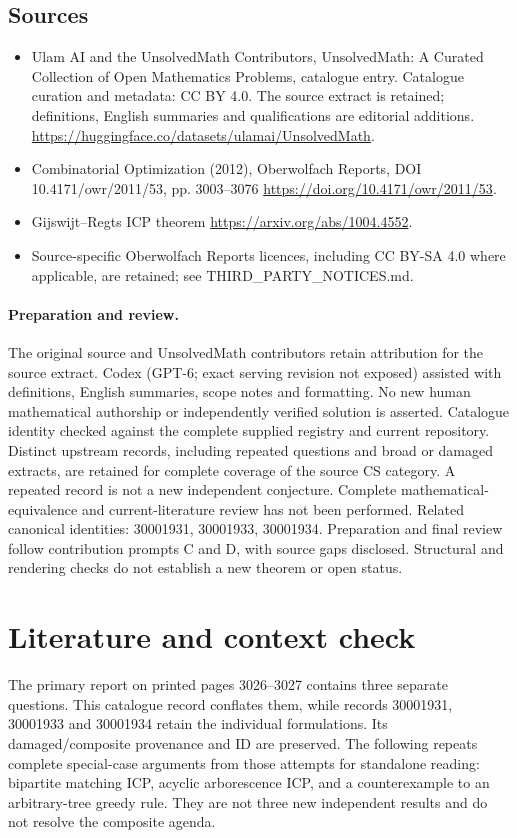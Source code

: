 \documentclass[11pt]{article}
\begin{document}
\subsection{Sources}
\begin{itemize}
\item[S1] Ulam AI and the UnsolvedMath Contributors, UnsolvedMath: A Curated Collection of Open Mathematics Problems, catalogue entry. Catalogue curation and metadata: CC BY 4.0. The source extract is retained; definitions, English summaries and qualifications are editorial additions.
\url{https://huggingface.co/datasets/ulamai/UnsolvedMath}.
\item[S2] Combinatorial Optimization (2012), Oberwolfach Reports, DOI 10.4171/owr/2011/53, pp. 3003--3076
\url{https://doi.org/10.4171/owr/2011/53}.
\item[S3] Gijswijt--Regts ICP theorem
\url{https://arxiv.org/abs/1004.4552}.
\item Source-specific Oberwolfach Reports licences, including CC BY-SA 4.0 where applicable, are retained; see THIRD\_PARTY\_NOTICES.md.
\end{itemize}
\paragraph{Preparation and review.}
The original source and UnsolvedMath contributors retain attribution for the source extract. Codex (GPT-6; exact serving revision not exposed) assisted with definitions, English summaries, scope notes and formatting. No new human mathematical authorship or independently verified solution is asserted. Catalogue identity checked against the complete supplied registry and current repository. Distinct upstream records, including repeated questions and broad or damaged extracts, are retained for complete coverage of the source CS category. A repeated record is not a new independent conjecture. Complete mathematical-equivalence and current-literature review has not been performed. Related canonical identities: 30001931, 30001933, 30001934. Preparation and final review follow contribution prompts C and D, with source gaps disclosed. Structural and rendering checks do not establish a new theorem or open status.
\label{end:statement}

\section{Literature and context check}
The primary report on printed pages 3026--3027 contains three separate questions. This catalogue record conflates them, while records 30001931, 30001933 and 30001934 retain the individual formulations. Its damaged/composite provenance and ID are preserved. The following repeats complete special-case arguments from those attempts for standalone reading: bipartite matching ICP, acyclic arborescence ICP, and a counterexample to an arbitrary-tree greedy rule. They are not three new independent results and do not resolve the composite agenda.
\end{document}
